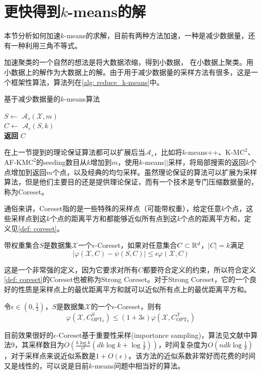 \section{更快得到\texorpdfstring{$k$}{k}-means的解}
本节分析如何加速$k$-means的求解，目前有两种方法加速，一种是减少数据量，还有一种利用三角不等式。

加速聚类的一个自然的想法是将大数据浓缩，得到小数据，
在小数据上聚类。用小数据上的解作为大数据上的解。由于用于减少数据量的采样方法有很多，这是一个框架性算法，算法列在\ref{alg: reduce_k-means}中。
\begin{algorithm}
    \caption{基于减少数据量的$k$-means算法}\label{alg: reduce_k-means}
    $S \gets$ $\mathcal{A}_s(\mathcal{X},m)$ \\
    $C \gets$ $\mathcal{A}_c(S,k)$ \\
    \textbf{返回} $C$
\end{algorithm}
在上一节提到的理论保证算法都可以扩展后当$\mathcal{A}_s$，比如将$k$-means++、K-M$\text{C}^2$、AF-KM$\text{C}^2$的seeding数目从$k$增加到$m$，使用$k$-means\(\vert \vert\)采样，将局部搜索的返回$k$个点增加到返回$m$个点，以及经典的均匀采样。虽然理论保证的算法可以扩展为采样算法，但是他们主要目的还是提供理论保证，而有一个技术是专门压缩数据量的，称为Coreset。

通俗来讲，Coreset指的是一些特殊的采样点（可能带权重），给定任意$k$个点，这些采样点到这$k$个点的距离平方和都能够近似所有点到这$k$个点的距离平方和，定义见\ref{def: coreset}。
\begin{definition}[常规Coreset]
    \label{def: coreset}
    带权重集合$S$是数据集$\mathcal{X}$一个$\epsilon$-Coreset，如果对任意集合$C \subset \mathbb{R}^d$，$|C|=k$满足
    \begin{equation}
        |\varphi(\mathcal{X},C) - \psi (S,C)| \leq \epsilon \varphi(\mathcal{X},C)
    \end{equation}
\end{definition}
这是一个非常强的定义，因为它要求对所有$C$都要符合定义的约束，所以符合定义\ref{def: coreset}的Coreset也被称为Strong Coreset。对于Strong Coreset，它的一个良好的性质是采样点上的最优距离平方和就可以近似所有点上的最优距离平方和。
\begin{corollary}[Coreset性质1]
    \label{cor: coreset_property1}
    令$\epsilon \in (0, \frac{1}{3})$，$S$是数据集$\mathcal{X}$的一个$\epsilon$-Coreset，则有
    \begin{equation}
        \varphi(\mathcal{X},C_{\text{OPT}_k}^S) \leq (1+3\epsilon) \varphi(\mathcal{X},C_{\text{OPT}_k}^{\mathcal{X}})
    \end{equation}
\end{corollary}
目前效果很好的$\epsilon$-Coreset基于重要性采样(importance sampling)，算法见文献\cite{bachem2018sampling}中算法9，其采样数目为$O(\frac{k\log k}{\epsilon^2}(dk\log k+\log\frac{1}{\delta}))$，时间复杂度为$O(ndk\log\frac{1}{\delta})$，对于采样点来说近似系数是$1+O(\epsilon)$。该方法的近似系数非常好而花费的时间又是线性的，可以说是目前$k$-means问题中相当好的算法。

